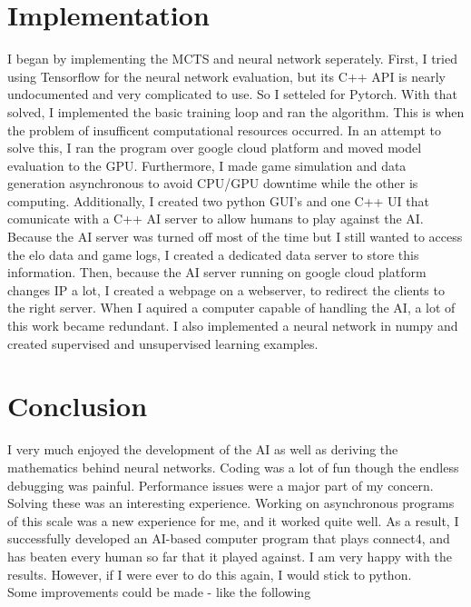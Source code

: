 \documentclass[12pt]{article}
\begin{document}
\section{Implementation}
I began by implementing the MCTS and neural network seperately. First, I tried using Tensorflow for the neural network evaluation, but its C++ API is nearly undocumented and very complicated to use. So I setteled for Pytorch. With that solved, I implemented the basic training loop and ran the algorithm. This is when the problem of insufficent computational resources occurred. In an attempt to solve this, I ran the program over google cloud platform and moved model evaluation to the GPU. Furthermore, I made game simulation and data generation asynchronous to avoid CPU/GPU downtime while the other is computing. Additionally, I created two python GUI's and one C++ UI that comunicate with a C++ AI server to allow humans to play against the AI. Because the AI server was turned off most of the time but I still wanted to access the elo data and game logs, I created a dedicated data server to store this information. Then, because the AI server running on google cloud platform changes IP a lot, I created a webpage on a webserver, to redirect the clients to the right server. When I aquired a computer capable of handling the AI, a lot of this work became redundant. I also implemented a neural network in numpy and created supervised and unsupervised learning examples.
\section{Conclusion}
I very much enjoyed the development of the AI as well as deriving the mathematics behind neural networks. Coding was a lot of fun though the endless debugging was painful. Performance issues were a major part of my concern. Solving these was an interesting experience. Working on asynchronous programs of this scale was a new experience for me, and it worked quite well.
As a result, I successfully developed an AI-based computer program that plays connect4, and has beaten every human so far that it played against.
I am very happy with the results. However, if I were ever to do this again, I would stick to python.
\\
Some improvements could be made - like the following
\end{document}
